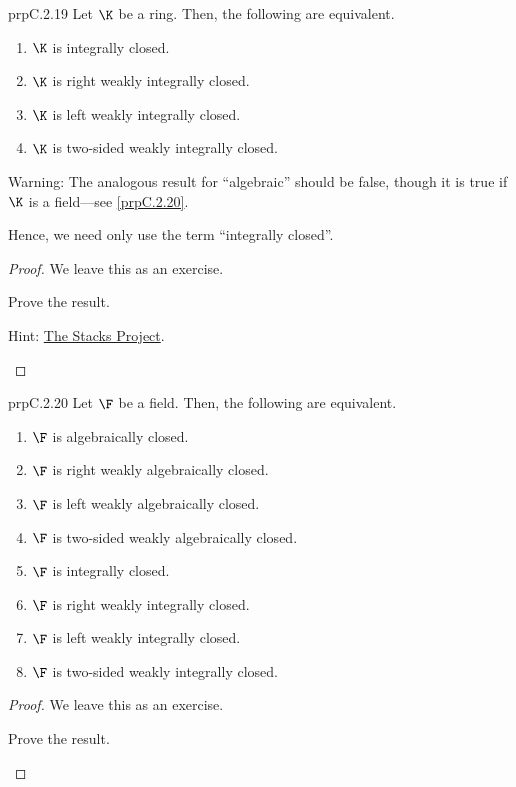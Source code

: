 \begin{prp}{}{prpC.2.19}
	Let $\K$ be a ring.  Then, the following are equivalent.
	\begin{enumerate}
		\item $\K$ is integrally closed.
		\item $\K$ is right weakly integrally closed.
		\item $\K$ is left weakly integrally closed.
		\item $\K$ is two-sided weakly integrally closed.
	\end{enumerate}
	\begin{rmk}
		Warning:  The analogous result for ``algebraic'' should be false, though it is true if $\K$ is a field---see \cref{prpC.2.20}.
	\end{rmk}
	\begin{rmk}
		Hence, we need only use the term ``integrally closed''.
	\end{rmk}
	\begin{proof}
		We leave this as an exercise.
		\begin{exr}[breakable=false]{}{}
			Prove the result.
			\begin{rmk}
				Hint:  \href{http://stacks.math.columbia.edu/tag/0DCK}{The Stacks Project}.
			\end{rmk}
		\end{exr}
	\end{proof}
\end{prp}
\begin{prp}{}{prpC.2.20}
	Let $\F$ be a field.  Then, the following are equivalent.
	\begin{enumerate}
		\item $\F$ is algebraically closed.
		\item $\F$ is right weakly algebraically closed.
		\item $\F$ is left weakly algebraically closed.
		\item $\F$ is two-sided weakly algebraically closed.
		\item $\F$ is integrally closed.
		\item $\F$ is right weakly integrally closed.
		\item $\F$ is left weakly integrally closed.
		\item $\F$ is two-sided weakly integrally closed.
	\end{enumerate}
	\begin{proof}
		We leave this as an exercise.
		\begin{exr}[breakable=false]{}{}
			Prove the result.
		\end{exr}
	\end{proof}
\end{prp}
